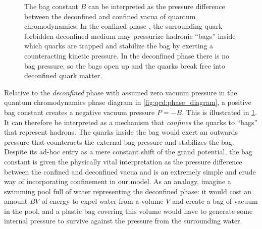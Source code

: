 \begin{figure}[t]
{
}
\caption{\label{fig:mit:bag_constant}%
	The bag constant $B$ can be interpreted as the pressure difference between the deconfined and confined vacua of quantum chromodynamics.
	In the confined phase ,
	the surrounding quark-forbidden deconfined medium may pressurize hadronic ``bags''
	inside which quarks are trapped and stabilize the bag by exerting a counteracting kinetic pressure.
	In the deconfined phase  there is no bag pressure,
	so the bags open up and the quarks break free into deconfined quark matter.
}
\end{figure}

Relative to the \emph{deconfined} phase with assumed zero vacuum pressure in the quantum chromodynamics phase diagram in \cref{fig:qcd:phase_diagram},
a positive bag constant creates a negative vacuum pressure $P = -B$.
This is illustrated in \cref{fig:mit:bag_constant}.
It can therefore be interpreted as a mechanism that \emph{confines} the quarks to ``bags'' that represent hadrons.
The quarks inside the bag would exert an outwards pressure that counteracts the external bag pressure and stabilizes the bag.
Despite its ad-hoc entry as a mere constant shift of the grand potential,
the bag constant is given the physically vital interpretation as the pressure difference between the confined and deconfined vacua
and is an extremely simple and crude way of incorporating confinement in our model.
As an analogy, imagine a swimming pool full of water representing the deconfined phase:
it would cost an amount $BV$ of energy to expel water from a volume $V$ and create a bag of vacuum in the pool,
and a plastic bag covering this volume would have to generate some internal pressure to survive against the pressure from the surrounding water.

